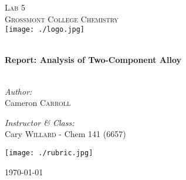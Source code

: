 \begin{titlepage}
\begin{center}

\textsc{\Large Lab 5}\\[1.5cm]
\textsc{\Large Grossmont College Chemistry}\\[0.5cm]
\texttt{[image: ./logo.jpg]}

\HRule \\[0.4cm]
{ \LARGE \bfseries Report: Analysis of Two-Component Alloy}\\[0.5cm]

\HRule \\[1.5cm]

\begin{minipage}{0.4\textwidth}
\begin{flushleft} \large
\emph{Author:}\\
Cameron \textsc{Carroll}\\[0.2cm]

\end{flushleft}
\end{minipage}
\begin{minipage}{0.4\textwidth}
\begin{flushright} \large
\emph{Instructor \& Class:}\\
Cary \textsc{Willard} - Chem 141 (6657)
\end{flushright}
\end{minipage}

\begin{center}
  \texttt{[image: ./rubric.jpg]}\\[0.7cm]
\end{center}

\vfill

{\large \today}

\end{center}
\end{titlepage}